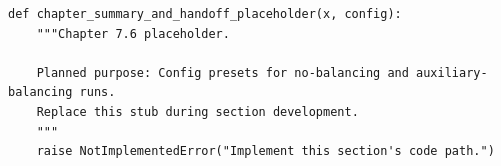 \begin{lstlisting}[style=bookpython,caption={Planned code placeholder for chapter summary and handoff.},label={lst:ch07-chapter-summary-and-handoff}]
def chapter_summary_and_handoff_placeholder(x, config):
    """Chapter 7.6 placeholder.

    Planned purpose: Config presets for no-balancing and auxiliary-balancing runs.
    Replace this stub during section development.
    """
    raise NotImplementedError("Implement this section's code path.")
\end{lstlisting}
